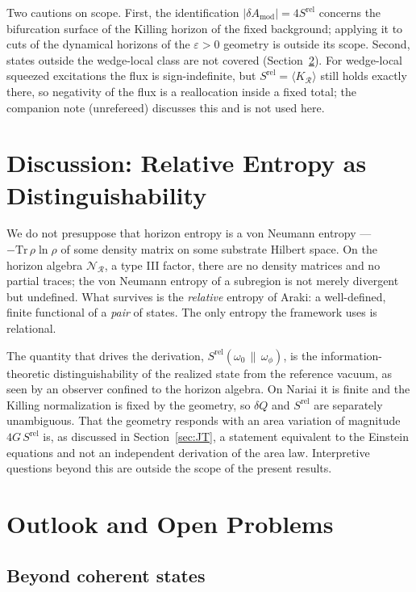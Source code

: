 \documentclass[11pt]{article}
\newcommand{\Srel}{S^{\mathrm{rel}}}
\begin{document}
Two cautions on scope. First, the identification $|\delta A_{\mathrm{mod}}|=4\Srel$ concerns the bifurcation surface of the Killing horizon of the fixed background; applying it to cuts of the dynamical horizons of the $\varepsilon>0$ geometry is outside its scope. Second, states outside the wedge-local class are not covered (Section~\ref{sec:outlook}). For wedge-local squeezed excitations the flux is sign-indefinite, but $\Srel=\langle K_{\mathcal R}\rangle$ still holds exactly there, so negativity of the flux is a reallocation inside a fixed total; the companion note \cite{SuppNariai} (unrefereed) discusses this and is not used here.

\section{Discussion: Relative Entropy as Distinguishability}
\label{sec:discussion}

We do not presuppose that horizon entropy is a von Neumann entropy --- $-\mathrm{Tr}\,\rho\ln\rho$ of some density matrix on some substrate Hilbert space. On the horizon algebra $\mathscr{N}_{\mathcal{R}}$, a type III factor, there are no density matrices and no partial traces; the von Neumann entropy of a subregion is not merely divergent but undefined. What survives is the \emph{relative} entropy of Araki: a well-defined, finite functional of a \emph{pair} of states. The only entropy the framework uses is relational.

The quantity that drives the derivation, $\Srel(\omega_0\,\|\,\omega_\phi)$, is the information-theoretic distinguishability of the realized state from the reference vacuum, as seen by an observer confined to the horizon algebra. On Nariai it is finite and the Killing normalization is fixed by the geometry, so $\delta Q$ and $\Srel$ are separately unambiguous. That the geometry responds with an area variation of magnitude $4G\,\Srel$ is, as discussed in Section~\ref{sec:JT}, a statement equivalent to the Einstein equations and not an independent derivation of the area law. Interpretive questions beyond this are outside the scope of the present results.

\section{Outlook and Open Problems}
\label{sec:outlook}

\subsection{Beyond coherent states}
\end{document}

